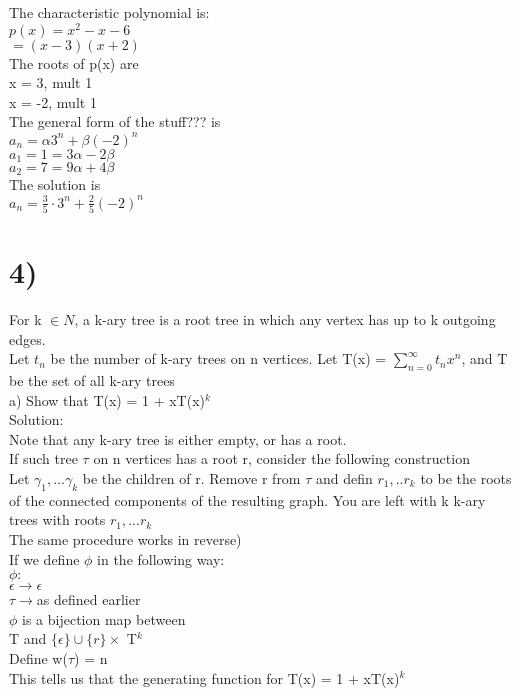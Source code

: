 \documentclass[12pt]{article}
\begin{document}
	The characteristic polynomial is:\\
	$p(x) = x^2 - x - 6$\\
	$= (x-3)(x+2)$\\
	The roots of p(x) are \\
	x = 3, mult 1\\
	x = -2, mult 1\\
	
	The general form of the stuff??? is \\
	$a_n = \alpha3^n + \beta(-2)^n$\\
	$a_1 = 1 = 3\alpha - 2\beta$\\
	$a_2 = 7 = 9\alpha + 4\beta$\\
	
	The solution is\\
	$a_n = \frac{3}{5} \cdot 3^n + \frac{2}{5}(-2)^n$\\
	
	\section*{4)}
	
	For k $\in N$, a k-ary tree is a root tree in which any vertex has up to k outgoing edges.\\
	
	Let $t_n$ be the number of k-ary trees on n vertices. Let T(x) = $\sum_{n=0}^{\infty}t_nx^n$, and T be the set of all k-ary trees\\
	
	a) Show that T(x) = 1 + xT(x)$^k$\\
	
	Solution:\\
	Note that any k-ary tree is either empty, or has a root.\\
	
	If such tree $\tau$ on n vertices has a root r, consider the following construction\\
	
	Let $\gamma_1,...\gamma_k$ be the children of r. Remove r from $\tau$ and defin $r_1,.. r_k$ to be the roots of the connected components of the resulting graph. You are left with k k-ary trees with roots $r_1,...r_k$\\
	
	The same procedure works in reverse)\\
	
	If we define $\phi$ in the following way:\\
	$\phi: $\\
	$\epsilon \rightarrow \epsilon$\\
	$\tau \rightarrow $as defined earlier\\
	$\phi$ is a bijection map between\\
	T and $\{\epsilon \} \cup \{r\} \times $ T$^k$\\
	
	Define w($\tau$) = n\\
	
	This tells us that the generating function for T(x) = 1 + xT(x)$^k$\\
	
\end{document}
